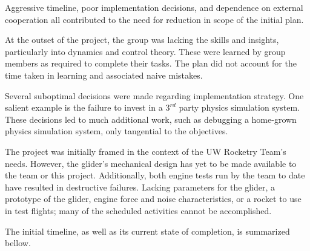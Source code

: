 \documentclass{sydeStyle}
\begin{document}
Aggressive timeline, poor implementation decisions, and dependence on external
cooperation all contributed to the need for reduction in scope of the initial
plan.

At the outset of the project, the group was lacking the skills and insights,
particularly into dynamics and control theory. These were learned by group
members as required to complete their tasks. The plan did not account for the
time taken in learning and associated naive mistakes.

Several suboptimal decisions were made regarding implementation strategy. One
salient example is the failure to invest in a $3^{rd}$ party physics simulation
system. These decisions led to much additional work, such as debugging a
home-grown physics simulation system, only tangential to the objectives.

The project was initially framed in the context of the UW Rocketry Team's needs.
However, the glider's mechanical design has yet to be made available to the team or
this project. Additionally, both engine tests run by the team to date have
resulted in destructive failures. Lacking parameters for the glider, a prototype
of the glider, engine force and noise characteristics, or a rocket to use in
test flights; many of the scheduled activities cannot be accomplished.

The initial timeline, as well as its current state of completion, is summarized
bellow.
\end{document}
